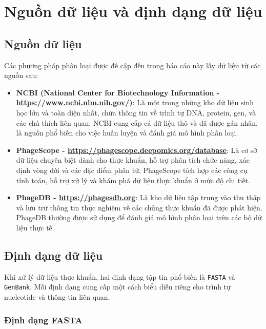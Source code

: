 \section{Nguồn dữ liệu và định dạng dữ liệu}

\subsection{Nguồn dữ liệu}

Các phương pháp phân loại được đề cập đến trong báo cáo này lấy dữ liệu từ các nguồn sau:

\begin{itemize}
    \item \textbf{NCBI (National Center for Biotechnology Information - \url{https://www.ncbi.nlm.nih.gov/})}: Là một trong những kho dữ liệu sinh học lớn và toàn diện nhất, chứa thông tin về trình tự DNA, protein, gen, và các chú thích liên quan. NCBI cung cấp cả dữ liệu thô và đã được gán nhãn, là nguồn phổ biến cho việc huấn luyện và đánh giá mô hình phân loại.
    
    \item \textbf{PhageScope - \url{https://phagescope.deepomics.org/database}}: Là cơ sở dữ liệu chuyên biệt dành cho thực khuẩn, hỗ trợ phân tích chức năng, xác định vòng đời và các đặc điểm phân tử. PhageScope tích hợp các công cụ tính toán, hỗ trợ xử lý và khám phá dữ liệu thực khuẩn ở mức độ chi tiết.
    
    \item \textbf{PhageDB - \url{https://phagesdb.org}}: Là kho dữ liệu tập trung vào thu thập và lưu trữ thông tin thực nghiệm về các chủng thực khuẩn đã được phát hiện. PhageDB thường được sử dụng để đánh giá mô hình phân loại trên các bộ dữ liệu thực tế.
\end{itemize}

\subsection{Định dạng dữ liệu}

Khi xử lý dữ liệu thực khuẩn, hai định dạng tập tin phổ biến là \texttt{FASTA} và \texttt{GenBank}. Mỗi định dạng cung cấp một cách biểu diễn riêng cho trình tự nucleotide và thông tin liên quan.

\subsubsection{Định dạng FASTA}


